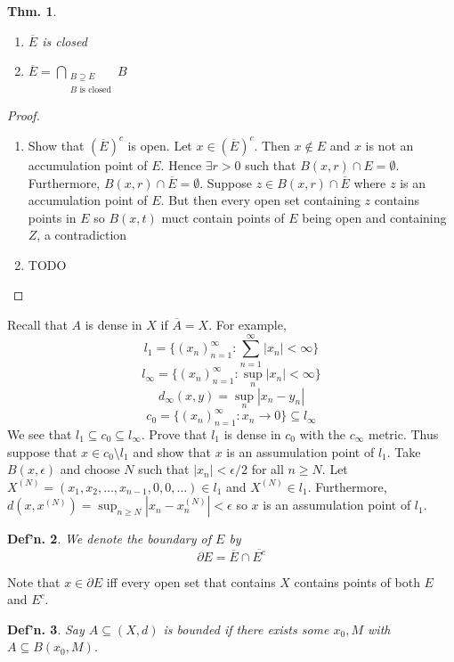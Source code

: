 \documentclass[12pt, a4paper]{book}
\newtheorem{theorem}{Thm.}[section]
\newtheorem{definition}[theorem]{Def'n.}
\theoremstyle{nonumberplain}
\newtheorem{proof}{Proof}
\begin{document}
\begin{theorem}\hspace{1cm}
    \begin{enumerate}
        \item $\overline{E}$ is closed
        \item $\displaystyle\overline{E}=\bigcap_{\substack{B\supseteq E\\B\text{ is closed}}}B$
    \end{enumerate}
\end{theorem}
\begin{proof}\hspace{1cm}
    \begin{enumerate}
        \item Show that $(\overline{E})^c$ is open. Let $x\in(\overline{E})^c$. Then $x\notin E$ and $x$ is not an accumulation
            point of $E$. Hence $\exists r>0$ such that $B(x,r)\cap E=\emptyset$. Furthermore, $B(x,r)\cap\overline{E}=\emptyset$.
            Suppose $z\in B(x,r)\cap\overline{E}$ where $z$ is an accumulation point of $E$. But then every open set
            containing $z$ contains points in $E$ so $B(x,t)$ muct contain points of $E$ being open and containing $Z$,
            a contradiction
        \item TODO
    \end{enumerate}
\end{proof}
Recall that $A$ is dense in $X$ if $\overline{A}=X$. For example,
\[l_1=\{(x_n)_{n=1}^\infty:\sum\limits_{n=1}^\infty|x_n|<\infty\}\]
\[l_\infty=\{(x_n)_{n=1}^\infty:\sup_n|x_n|<\infty\}\]
\[d_\infty(x,y)=\sup_n|x_n-y_n|\]
\[c_0=\{(x_n)_{n=1}^\infty:x_n\to 0\}\subseteq l_\infty\]
We see that $l_1\subseteq c_0\subseteq l_\infty$. Prove that $l_1$ is dense in $c_0$ with the $c_\infty$ metric. Thus
suppose that $x\in c_0\setminus l_1$ and show that $x$ is an assumulation point of $l_1$. Take $B(x,\epsilon)$ and choose $N$
such that $|x_n|<\epsilon/2$ for all $n\geq N$. Let $X^{(N)}=(x_1,x_2,\ldots,x_{n-1},0,0,\ldots)\in l_1$ and $X^{(N)}\in l_1$.
Furthermore, $d(x,x^{(N)})=\sup_{n\geq N}|x_n-x_n^{(N)}|<\epsilon$ so $x$ is an assumulation point of $l_1$.

\begin{definition}
    We denote the boundary of $E$ by
    \[\partial E=\overline{E}\cap\overline{E^c}\]
\end{definition}
Note that $x\in\partial E$ iff every open set that contains $X$ contains points of both $E$ and $E^c$.
\begin{definition}
    Say $A\subseteq(X,d)$ is bounded if there exists some $x_0,M$ with $A\subseteq B(x_0,M)$.
\end{definition}
\end{document}
